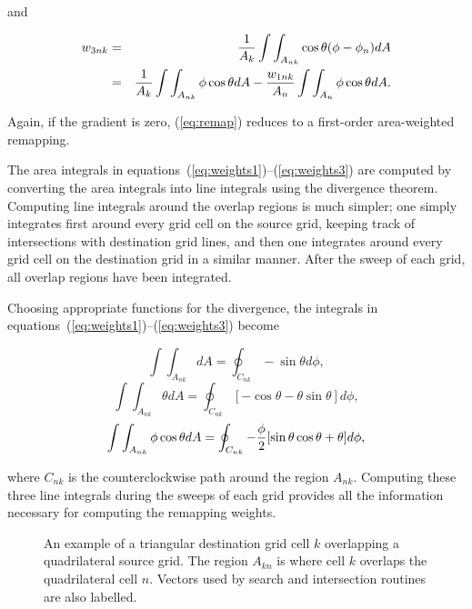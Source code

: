 \begin{description}
     and

\begin{eqnarray}\label{eq:weights3}
w_{3nk} & = & {1\over{A_k}}\int\int_{A_{nk}}\cos\theta(\phi-\phi_n)dA \nonumber \\
        & = & {1\over{A_k}}\int\int_{A_{nk}}\phi\cos\theta dA -
              {{w_{1nk}}\over{A_n}}\int\int_{A_n}\phi\cos\theta dA .
\end{eqnarray}

     Again, if the gradient is zero, ({\ref{eq:remap}}) reduces to a first-order
     area-weighted remapping. 

     The area integrals in equations~(\ref{eq:weights1})--(\ref{eq:weights3})
     are computed by converting the area integrals into line integrals using the
     divergence theorem.  Computing line integrals around the overlap regions
     is much simpler; one simply integrates first around every grid cell on the
     source grid, keeping track of intersections with destination grid lines,
     and then one integrates around every grid cell on the destination grid in
     a similar manner.  After the sweep of each grid, all overlap regions have
     been integrated.

     Choosing appropriate functions for the divergence, the integrals in
     equations~(\ref{eq:weights1})--(\ref{eq:weights3}) become

\begin{equation}
\int\int_{A_{nk}}dA = \oint_{C_{nk}} -\sin\theta d\phi,
\end{equation}
\begin{equation}
\int\int_{A_{nk}}\theta dA = 
 \oint_{C_{nk}} [-\cos\theta-\theta\sin\theta]d\phi,
\end{equation}
\begin{equation}
\int\int_{A_{nk}}\phi\cos\theta dA = 
\oint_{C_{nk}} -{\phi\over 2}[\sin\theta\cos\theta + \theta]d\phi,
\end{equation}

     where $C_{nk}$ is the counterclockwise path around the region $A_{nk}$.
     Computing these three line integrals during the sweeps of each grid
     provides all the information necessary for computing the remapping weights.

\begin{figure}
  \caption{An example of a triangular destination grid cell $k$ overlapping
           a quadrilateral source grid.  The region $A_{kn}$
           is where cell $k$ overlaps the quadrilateral cell $n$.
           Vectors used by search and intersection routines are
           also labelled. \label{fig:grids}}


\end{figure}
\end{description}
